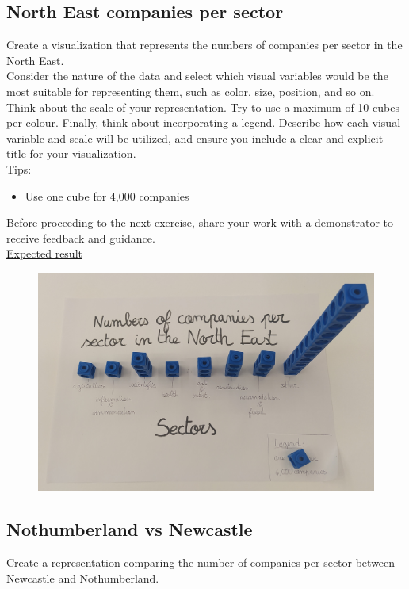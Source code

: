 \documentclass[11pt]{article}
\begin{document}
\subsection{North East companies per sector}

Create a visualization that represents the numbers of companies per sector in the North East.\\

Consider the nature of the data and select which visual variables would be the most suitable for representing them, such as color, size, position, and so on. Think about the scale of your representation. Try to use a maximum of 10 cubes per colour. Finally, think about incorporating a legend. Describe how each visual variable and scale will be utilized, and ensure you include a clear and explicit title for your visualization.\\

Tips:
\begin{itemize}
    \item Use one cube for 4,000 companies
\end{itemize}

Before proceeding to the next exercise, share your work with a demonstrator to receive feedback and guidance.\\

\underline{Expected result}

\begin{figure}[h!]
    \centering
    \includegraphics[width=.5\linewidth]{img/exe1-1.jpg}
\end{figure}

\subsection{Nothumberland vs Newcastle}

Create a representation comparing the number of companies per sector between Newcastle and Nothumberland.\\
\end{document}

